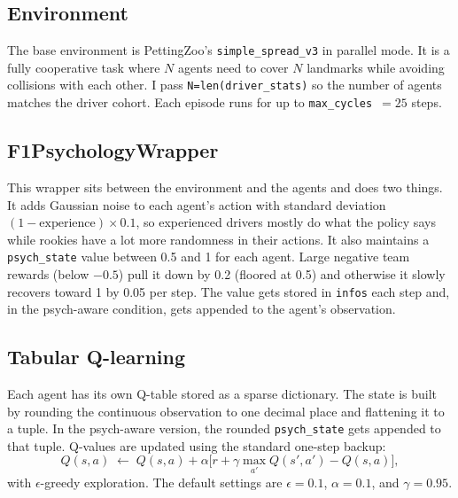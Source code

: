 \documentclass[11pt]{article}
\begin{document}
\subsection*{Environment}
The base environment is PettingZoo's \texttt{simple\_spread\_v3} in parallel mode. It is
a fully cooperative task where $N$ agents need to cover $N$ landmarks while avoiding
collisions with each other. I pass \texttt{N=len(driver\_stats)} so the number of agents
matches the driver cohort. Each episode runs for up to \texttt{max\_cycles}~$= 25$ steps.

\subsection*{F1PsychologyWrapper}
This wrapper sits between the environment and the agents and does two things. It adds
Gaussian noise to each agent's action with standard deviation $(1 - \text{experience}) \times 0.1$,
so experienced drivers mostly do what the policy says while rookies have a lot more
randomness in their actions. It also maintains a \texttt{psych\_state} value between 0.5
and 1 for each agent. Large negative team rewards (below $-0.5$) pull it down by 0.2
(floored at 0.5) and otherwise it slowly recovers toward 1 by 0.05 per step. The value gets stored in \texttt{infos} each step and,
in the psych-aware condition, gets appended to the agent's observation.

\subsection*{Tabular Q-learning}
Each agent has its own Q-table stored as a sparse dictionary. The state is built by
rounding the continuous observation to one decimal place and flattening it to a tuple.
In the psych-aware version, the rounded \texttt{psych\_state} gets appended to that
tuple. Q-values are updated using the standard one-step backup:
\begin{equation}
    Q(s,a) \;\leftarrow\; Q(s,a) + \alpha
    \bigl[ r + \gamma \max_{a'} Q(s',a') - Q(s,a) \bigr],
    \label{eq:qlearn}
\end{equation}
with $\epsilon$-greedy exploration. The default settings are $\epsilon = 0.1$,
$\alpha = 0.1$, and $\gamma = 0.95$.
\end{document}
